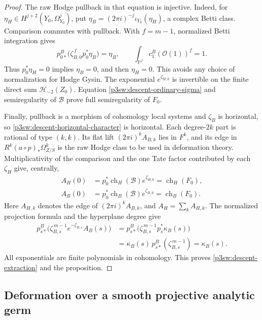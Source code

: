 \documentclass[11pt]{article}
\numberwithin{equation}{section}
\begin{document}
\begin{proof}
The raw Hodge pullback in that equation is injective.  Indeed, for
\(\eta_H\in H^{j+2}(Y_0,\Omega_{Y_0}^j)\), put
\(\eta_B=(2\pi i)^{-j}\iota_{Y_0}(\eta_H)\), a complex Betti class.
Comparison commutes with pullback.  With \(f=m-1\), normalized Betti
integration gives
\[
 p_{0*}^B\bigl(\zeta_{B,0}^{\,f}p_0^*\eta_B\bigr)=\eta_B,
 \qquad
 \int_{\mathbb P^f}c_1^B(\mathcal O(1))^f=1.
\]
Thus \(p_0^*\eta_H=0\) implies \(\eta_B=0\), and then
\(\eta_H=0\).  This avoids any choice of normalization for Hodge
Gysin.  The exponential \(e^{\zeta_{H,0}}\) is invertible on the
finite direct sum \(\mathcal H_{-2}(Z_0)\).  Equation
\eqref{p3sw:descent-ordinary-sigma} and semiregularity of
\(\mathcal B\) prove full semiregularity of \(F_0\).

Finally, pullback is a morphism of cohomology local systems and
\(\zeta_B\) is horizontal, so \eqref{p3sw:descent-horizontal-character}
is horizontal.  Each degree-\(2k\) part is rational of type \((k,k)\).
Its flat lift \((2\pi i)^kA_{B,k}\) lies in \(F^k\), and its edge
in \(R^k(a\circ p)_*\Omega^k_{Z/S}\) is the raw Hodge class to be used
in deformation theory.  Multiplicativity of the comparison and the
one Tate factor contributed by each \(\zeta_H\) give, centrally,
\begin{equation}
\label{p3sw:descent-central-character}
 \begin{split}
 A_H(0)&=p_0^*\operatorname{ch}_H(\mathcal B)e^{\zeta_{H,0}}
          =\operatorname{ch}_H(F_0),\\
 A_B(0)&=p_0^*\operatorname{ch}_B(\mathcal B)e^{\zeta_{B,0}}
          =\operatorname{ch}_B(F_0).
 \end{split}
\end{equation}
Here \(A_{H,k}\) denotes the edge of \((2\pi i)^kA_{B,k}\), and
\(A_H=\sum_kA_{H,k}\).
The normalized projection formula and the hyperplane degree give
\[
 \begin{split}
 p_{s*}^B\bigl(\zeta_{B,s}^{\,m-1}e^{-\zeta_{B,s}}A_B(s)\bigr)
 &=p_{s*}^B\bigl(\zeta_{B,s}^{\,m-1}p_s^*\kappa_B(s)\bigr)\\
 &=\kappa_B(s)\,p_{s*}^B(\zeta_{B,s}^{\,m-1})
 =\kappa_B(s).
 \end{split}
\]
All exponentials are finite polynomials in cohomology.  This proves
\eqref{p3sw:descent-extraction} and the proposition.
\end{proof}
\subsection{Deformation over a smooth projective analytic germ}
\label{p3sw:bf-section}
\end{document}
